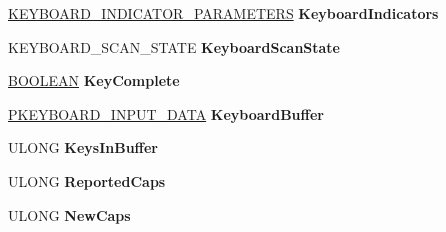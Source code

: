 \begin{DoxyCompactItemize}
\item 
\mbox{\label{struct___i8042___k_e_y_b_o_a_r_d___e_x_t_e_n_s_i_o_n_aaed62c6157598287c7533f6e2a12d28e}} 
\hyperlink{struct___k_e_y_b_o_a_r_d___i_n_d_i_c_a_t_o_r___p_a_r_a_m_e_t_e_r_s}{K\+E\+Y\+B\+O\+A\+R\+D\+\_\+\+I\+N\+D\+I\+C\+A\+T\+O\+R\+\_\+\+P\+A\+R\+A\+M\+E\+T\+E\+RS} {\bfseries Keyboard\+Indicators}
\item 
\mbox{\label{struct___i8042___k_e_y_b_o_a_r_d___e_x_t_e_n_s_i_o_n_aabe08aabcb298b7e43cfc0da65d4ca34}} 
K\+E\+Y\+B\+O\+A\+R\+D\+\_\+\+S\+C\+A\+N\+\_\+\+S\+T\+A\+TE {\bfseries Keyboard\+Scan\+State}
\item 
\mbox{\label{struct___i8042___k_e_y_b_o_a_r_d___e_x_t_e_n_s_i_o_n_af17b7cfee98359cfd89d637610315609}} 
\hyperlink{_processor_bind_8h_a112e3146cb38b6ee95e64d85842e380a}{B\+O\+O\+L\+E\+AN} {\bfseries Key\+Complete}
\item 
\mbox{\label{struct___i8042___k_e_y_b_o_a_r_d___e_x_t_e_n_s_i_o_n_ac658493f783b13bfe6b2b43aaee94602}} 
\hyperlink{struct___k_e_y_b_o_a_r_d___i_n_p_u_t___d_a_t_a}{P\+K\+E\+Y\+B\+O\+A\+R\+D\+\_\+\+I\+N\+P\+U\+T\+\_\+\+D\+A\+TA} {\bfseries Keyboard\+Buffer}
\item 
\mbox{\label{struct___i8042___k_e_y_b_o_a_r_d___e_x_t_e_n_s_i_o_n_a8ee6537d82c5cd67df064fb98e49db8f}} 
U\+L\+O\+NG {\bfseries Keys\+In\+Buffer}
\item 
\mbox{\label{struct___i8042___k_e_y_b_o_a_r_d___e_x_t_e_n_s_i_o_n_ad63ec97b76bbceaf22d299ffb1f3306f}} 
U\+L\+O\+NG {\bfseries Reported\+Caps}
\item 
\mbox{\label{struct___i8042___k_e_y_b_o_a_r_d___e_x_t_e_n_s_i_o_n_a494ecce1c3ca5ddce38236e2cf3b3628}} 
U\+L\+O\+NG {\bfseries New\+Caps}
\item 
\mbox{\label{struct___i8042___k_e_y_b_o_a_r_d___e_x_t_e_n_s_i_o_n_a4e04ec2b4fbf779dc52bdfa5019c7d41}} 

\end{DoxyCompactItemize}
